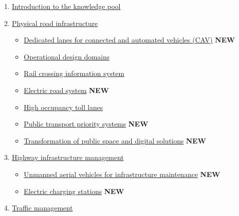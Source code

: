 \documentclass[
]{book}
\providecommand{\tightlist}{%
  \setlength{\itemsep}{0pt}\setlength{\parskip}{0pt}}
\begin{document}
\begin{enumerate}
\def\labelenumi{\arabic{enumi}.}
\tightlist
\item
  \protect\hyperlink{intro}{Introduction to the knowledge pool}
\item
  \protect\hyperlink{infrastructure}{Physical road infrastructure}

  \begin{itemize}
  \tightlist
  \item
    \protect\hyperlink{dedicated_lanes}{Dedicated lanes for connected and automated vehicles (CAV)} \textbf{NEW}
  \item
    \protect\hyperlink{ODD}{Operational design domains}
  \item
    \protect\hyperlink{rail_crossing_info_system}{Rail crossing information system}
  \item
    \protect\hyperlink{ers}{Electric road system} \textbf{NEW}
  \item
    \protect\hyperlink{high_occupancy}{High occupancy toll lanes}
  \item
    \protect\hyperlink{public_trans_priority}{Public transport priority systems} \textbf{NEW}
  \item
    \protect\hyperlink{transformation_public_space}{Transformation of public space and digital solutions} \textbf{NEW}
  \end{itemize}
\item
  \protect\hyperlink{highway}{Highway infrastructure management}

  \begin{itemize}
  \tightlist
  \item
    \protect\hyperlink{uav}{Unmanned aerial vehicles for infrastructure maintenance} \textbf{NEW}
  \item
    \protect\hyperlink{charging_station}{Electric charging stations} \textbf{NEW}
  \end{itemize}
\item
  \protect\hyperlink{traffic}{Traffic management}


\end{enumerate}
\end{document}
